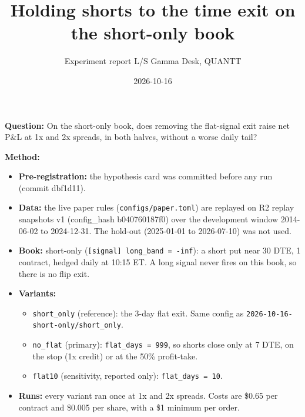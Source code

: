 \documentclass{article}
\title{Holding shorts to the time exit on the short-only book}
\author{Experiment report \textperiodcentered{} L/S Gamma Desk, QUANTT}
\date{2026-10-16}
\begin{document}
\maketitle

\textbf{Question:} On the short-only book, does removing the flat-signal exit raise net P\&L at 1x and 2x spreads, in both halves, without a worse daily tail?

\textbf{Method:}

\begin{itemize}

\item \textbf{Pre-registration:} the hypothesis card was committed before any run (commit dbf1d11).

\item \textbf{Data:} the live paper rules (\texttt{configs/\allowbreak{}paper.\allowbreak{}toml}) are replayed on R2 replay snapshots v1 (config\_hash b040760187f0) over the development window 2014-06-02 to 2024-12-31. The hold-out (2025-01-01 to 2026-07-10) was not used.

\item \textbf{Book:} short-only (\texttt{[signal] long\_\allowbreak{}band = -\allowbreak{}inf}): a short put near 30 DTE, 1 contract, hedged daily at 10:15 ET. A long signal never fires on this book, so there is no flip exit.

\item \textbf{Variants:}

\begin{itemize}

\item \texttt{short\_\allowbreak{}only} (reference): the 3-day flat exit. Same config as \texttt{2026-\allowbreak{}10-\allowbreak{}16-\allowbreak{}short-\allowbreak{}only/\allowbreak{}short\_\allowbreak{}only}.

\item \texttt{no\_\allowbreak{}flat} (primary): \texttt{flat\_\allowbreak{}days = 999}, so shorts close only at 7 DTE, on the stop (1x credit) or at the 50\% profit-take.

\item \texttt{flat10} (sensitivity, reported only): \texttt{flat\_\allowbreak{}days = 10}.

\end{itemize}

\item \textbf{Runs:} every variant ran once at 1x and 2x spreads. Costs are \$0.65 per contract and \$0.005 per share, with a \$1 minimum per order.

\end{itemize}
\end{document}
